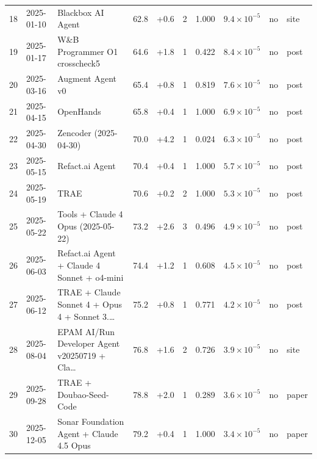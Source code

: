 \begin{tabular}{rllrrrrrll}
18 & 2025-01-10 & Blackbox AI Agent & 62.8 & +0.6 & 2 & 1.000 & $9.4\times10^{-5}$ & no & site \\
19 & 2025-01-17 & W\&B Programmer O1 crosscheck5 & 64.6 & +1.8 & 1 & 0.422 & $8.4\times10^{-5}$ & no & post \\
20 & 2025-03-16 & Augment Agent v0 & 65.4 & +0.8 & 1 & 0.819 & $7.6\times10^{-5}$ & no & post \\
21 & 2025-04-15 & OpenHands & 65.8 & +0.4 & 1 & 1.000 & $6.9\times10^{-5}$ & no & post \\
22 & 2025-04-30 & Zencoder (2025-04-30) & 70.0 & +4.2 & 1 & 0.024 & $6.3\times10^{-5}$ & no & post \\
23 & 2025-05-15 & Refact.ai Agent & 70.4 & +0.4 & 1 & 1.000 & $5.7\times10^{-5}$ & no & post \\
24 & 2025-05-19 & TRAE & 70.6 & +0.2 & 2 & 1.000 & $5.3\times10^{-5}$ & no & post \\
25 & 2025-05-22 & Tools + Claude 4 Opus (2025-05-22) & 73.2 & +2.6 & 3 & 0.496 & $4.9\times10^{-5}$ & no & post \\
26 & 2025-06-03 & Refact.ai Agent + Claude 4 Sonnet + o4-mini & 74.4 & +1.2 & 1 & 0.608 & $4.5\times10^{-5}$ & no & post \\
27 & 2025-06-12 & TRAE + Claude Sonnet 4 + Opus 4 + Sonnet 3.\ldots & 75.2 & +0.8 & 1 & 0.771 & $4.2\times10^{-5}$ & no & post \\
28 & 2025-08-04 & EPAM AI/Run Developer Agent v20250719 + Cla\ldots & 76.8 & +1.6 & 2 & 0.726 & $3.9\times10^{-5}$ & no & site \\
29 & 2025-09-28 & TRAE + Doubao-Seed-Code & 78.8 & +2.0 & 1 & 0.289 & $3.6\times10^{-5}$ & no & paper \\
30 & 2025-12-05 & Sonar Foundation Agent + Claude 4.5 Opus & 79.2 & +0.4 & 1 & 1.000 & $3.4\times10^{-5}$ & no & paper \\
\bottomrule
\end{tabular}
